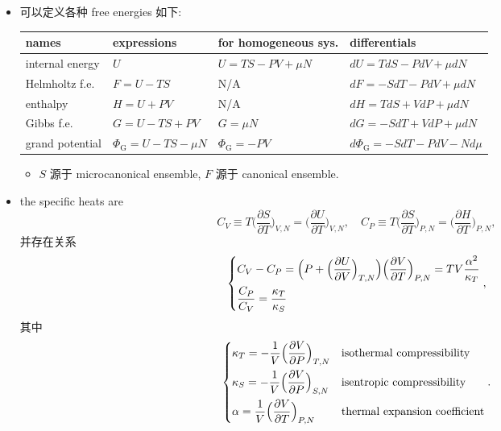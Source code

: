 \begin{itemize}
	\item 可以定义各种 free energies 如下:
	
	\begin{center}
		\begin{tabularx}{\linewidth}{XXXl}
			\toprule 
			names & expressions & for homogeneous sys. & differentials \\
			\midrule 
			internal energy & $U$ & $U = T S - P V + \mu N$ & $dU = T dS - P dV + \mu dN$ \\
			Helmholtz f.e. & $F = U - T S$ & N/A & $dF = - S dT - P dV + \mu dN$ \\
			enthalpy & $H = U + P V$ & N/A & $dH = T dS + V dP + \mu dN$ \\
			Gibbs f.e. & $G = U - T S + P V$ & $G = \mu N$ & $dG = - S dT + V dP + \mu dN$ \\
			grand potential & $\Phi_\text{G} = U - T S - \mu N$ & $\Phi_\text{G} = - P V$ & $d\Phi_\text{G} = - S dT - P dV - N d\mu$ \\
			\bottomrule
		\end{tabularx}
	\end{center}
	
	\begin{itemize}
		\item $S$ 源于 microcanonical ensemble, $F$ 源于 canonical ensemble.
	\end{itemize}
	
	\item the specific heats are
	\begin{equation}
		C_V \equiv T \Big( \frac{\partial S}{\partial T} \Big)_{V, N} = \Big( \frac{\partial U}{\partial T} \Big)_{V, N}, \quad C_P \equiv T \Big( \frac{\partial S}{\partial T} \Big)_{P, N} = \Big( \frac{\partial H}{\partial T} \Big)_{P, N},
	\end{equation}
	并存在关系
	\begin{equation}
		\begin{dcases}
			C_V - C_P = \Big( P + \Big( \frac{\partial U}{\partial V} \Big)_{T, N} \Big) \Big( \frac{\partial V}{\partial T} \Big)_{P, N}  = T V \frac{\alpha^2}{\kappa_T} \\
			\frac{C_P}{C_V} = \frac{\kappa_T}{\kappa_S}
		\end{dcases},
	\end{equation}
	其中
	\begin{equation}
		\begin{dcases}
			\kappa_T = - \frac{1}{V} \Big( \frac{\partial V}{\partial P} \Big)_{T, N} & \text{isothermal compressibility} \\
			\kappa_S = - \frac{1}{V} \Big( \frac{\partial V}{\partial P} \Big)_{S, N} & \text{isentropic compressibility} \\
			\alpha = \frac{1}{V} \Big( \frac{\partial V}{\partial T} \Big)_{P, N} & \text{thermal expansion coefficient}
		\end{dcases}.
	\end{equation}
\end{itemize}

